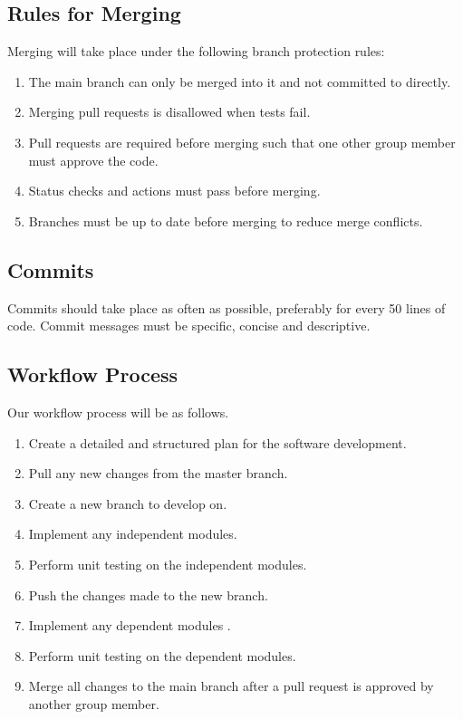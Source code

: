 \documentclass{article}
\begin{document}
\subsection{Rules for Merging}

Merging will take place under the following branch protection rules: 

\begin{enumerate}

\item The main branch can only be merged into it and not committed to directly. 
\item Merging pull requests is disallowed when tests fail. 
\item Pull requests are required before merging such that one other group member must approve the code. 
\item Status checks and actions must pass before merging. 
\item Branches must be up to date before merging to reduce merge conflicts. 

\end{enumerate} 

\subsection{Commits}

Commits should take place as often as possible, preferably for every 50 lines of code. Commit messages must be specific, concise and descriptive. 

\subsection{Workflow Process}

Our workflow process will be as follows.

\begin{enumerate}
\item Create a detailed and structured plan for the software development. 
\item Pull any new changes from the master branch. 
\item Create a new branch to develop on. 
\item Implement any independent modules. 
\item Perform unit testing on the independent modules. 
\item Push the changes made to the new branch.  
\item Implement any dependent modules .
\item Perform unit testing on the dependent modules.  
\item Merge all changes to the main branch after a pull request is approved by another group member.  
\end{enumerate}
\end{document}
